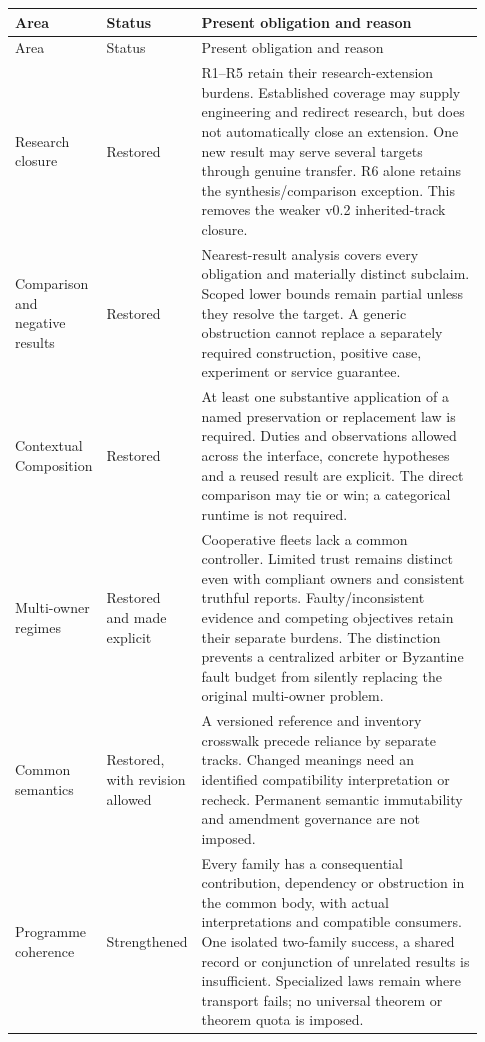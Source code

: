 \documentclass[11pt]{article}
\begin{document}
{\small
\renewcommand{\arraystretch}{1.15}
\begin{longtable}{@{}P{0.16\linewidth}P{0.13\linewidth}P{0.64\linewidth}@{}}
\toprule
Area & Status & Present obligation and reason \\
\midrule
\endfirsthead
\toprule
Area & Status & Present obligation and reason \\
\midrule
\endhead
Research closure & Restored & R1--R5 retain their research-extension burdens. Established coverage may supply engineering and redirect research, but does not automatically close an extension. One new result may serve several targets through genuine transfer. R6 alone retains the synthesis/comparison exception. This removes the weaker v0.2 inherited-track closure. \\
Comparison and negative results & Restored & Nearest-result analysis covers every obligation and materially distinct subclaim. Scoped lower bounds remain partial unless they resolve the target. A generic obstruction cannot replace a separately required construction, positive case, experiment or service guarantee. \\
Contextual Composition & Restored & At least one substantive application of a named preservation or replacement law is required. Duties and observations allowed across the interface, concrete hypotheses and a reused result are explicit. The direct comparison may tie or win; a categorical runtime is not required. \\
Multi-owner regimes & Restored and made explicit & Cooperative fleets lack a common controller. Limited trust remains distinct even with compliant owners and consistent truthful reports. Faulty/inconsistent evidence and competing objectives retain their separate burdens. The distinction prevents a centralized arbiter or Byzantine fault budget from silently replacing the original multi-owner problem. \\
Common semantics & Restored, with revision allowed & A versioned reference and inventory crosswalk precede reliance by separate tracks. Changed meanings need an identified compatibility interpretation or recheck. Permanent semantic immutability and amendment governance are not imposed. \\
Programme coherence & Strengthened & Every family has a consequential contribution, dependency or obstruction in the common body, with actual interpretations and compatible consumers. One isolated two-family success, a shared record or conjunction of unrelated results is insufficient. Specialized laws remain where transport fails; no universal theorem or theorem quota is imposed. \\

\end{longtable}}
\end{document}
